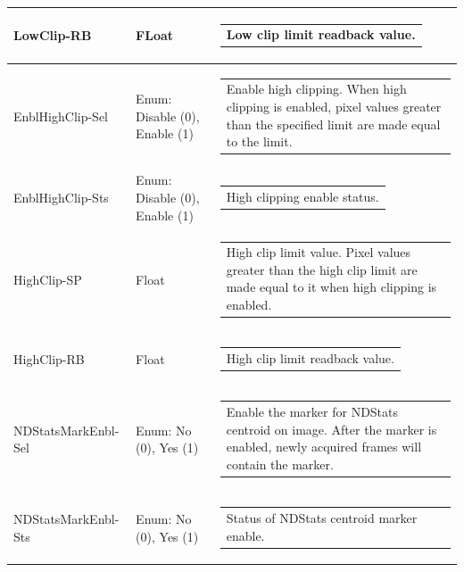 \documentclass[openany]{article}
\begin{document}
\begin{longtable}{| m{3.0cm} m{4.5cm}  m{7.0cm} |}
        LowClip-RB & FLoat & \begin{tabular}{@{}m{6cm}@{}}
	        Low clip limit readback value.
            \end{tabular} \hypertarget{pv:enbl-high-clip}{}\\ \hline
        EnblHighClip-Sel & Enum: Disable (0), Enable (1) & \begin{tabular}{@{}m{6cm}@{}}
                Enable high clipping. When high clipping is enabled,
                pixel values greater than the specified limit are made equal to the
                limit.
            \end{tabular} \\ \hline
        EnblHighClip-Sts & Enum: Disable (0), Enable (1) & \begin{tabular}{@{}m{6cm}@{}}
                High clipping enable status.
            \end{tabular} \hypertarget{pv:high-clip}{}\\ \hline
        HighClip-SP & Float & \begin{tabular}{@{}m{6cm}@{}}
                High clip limit value. Pixel values greater than the high clip
                limit are made equal to it when high clipping is enabled.
            \end{tabular} \\ \hline
        HighClip-RB & Float & \begin{tabular}{@{}m{6cm}@{}}
                High clip limit readback value.
            \end{tabular} \hypertarget{pv:ndstats-mark-enbl}{}\\ \hline
        NDStatsMarkEnbl-Sel & Enum: No (0), Yes (1) & \begin{tabular}{@{}m{6cm}@{}}
                Enable the marker for NDStats centroid on image. After the marker
                is enabled, newly acquired frames will contain the marker.
            \end{tabular} \\ \hline
        NDStatsMarkEnbl-Sts & Enum: No (0), Yes (1) & \begin{tabular}{@{}m{6cm}@{}}
                Status of NDStats centroid marker enable.
            \end{tabular} \hypertarget{pv:ndstats-mark-size}{}\\ \hline

\end{longtable}
\end{document}

